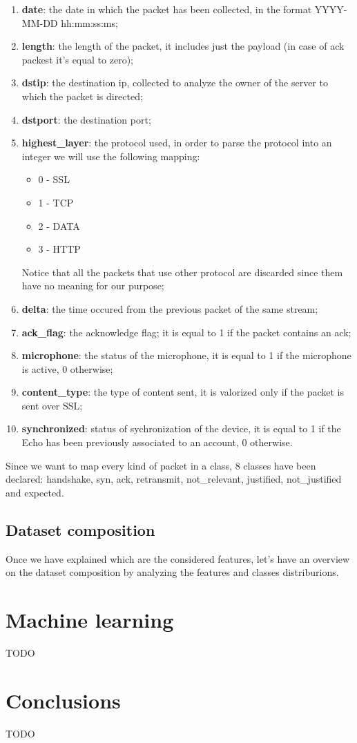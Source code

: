 \documentclass[sigconf]{acmart}
\begin{document}
    \begin{enumerate}
        \item \textbf{date}: the date in which the packet has been collected, in the format YYYY-MM-DD hh:mm:ss:ms;
        \item \textbf{length}: the length of the packet, it includes just the payload (in case of ack packest it's equal to zero);
        \item \textbf{dstip}: the destination ip, collected to analyze the owner of the server to which the packet is directed;
        \item \textbf{dstport}: the destination port;
        \item \textbf{highest\_layer}: the protocol used, in order to parse the protocol into an integer we will use the following mapping:
        \begin{itemize}
            \item 0 - SSL
            \item 1 - TCP
            \item 2 - DATA
            \item 3 - HTTP
        \end{itemize}
        Notice that all the packets that use other protocol are discarded since them have no meaning for our purpose;
        \item \textbf{delta}: the time occured from the previous packet of the same stream;
        \item \textbf{ack\_flag}: the acknowledge flag; it is equal to 1 if the packet contains an ack;
        \item \textbf{microphone}: the status of the microphone, it is equal to 1 if the microphone is active, 0 otherwise;
        \item \textbf{content\_type}: the type of content sent, it is valorized only if the packet is sent over SSL;
        \item \textbf{synchronized}: status of sychronization of the device, it is equal to 1 if the Echo has been previously associated to an account, 0 otherwise.
    \end{enumerate}
    Since we want to map every kind of packet in a class, 8 classes have been declared: handshake, syn, ack, retransmit, not\_relevant, justified, not\_justified and expected. 
	\subsection{Dataset composition}
	Once we have explained which are the considered features, let's have an overview on the dataset composition by analyzing the features and classes distriburions.


    \section{Machine learning}
    TODO


    \section{Conclusions}
    TODO

    
    
\end{document}
